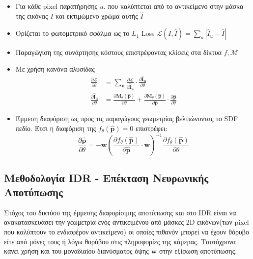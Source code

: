     \begin{itemize}
        \item Για κάθε pixel παρατήρησης \(u\). που καλύπτεται από το αντικείμενο  στην μάσκα της εικόνας \(I\) και εκτιμώμενο χρώμα αυτής \(\hat{I}\)
        \item Ορίζεται το φωτομετρικό σφάλμα ως το \(L_1\) Loss \(\mathcal{L}(I, \hat{I}) = \sum_{u}{|\hat{I}_u - \hat{I}|}\)
        \item Παραγώγιση της συνάρτησης κόστους επιστρέφοντας κλίσεις στα δίκτυα  \(f, \mathcal{M}\)
        \item Με χρήση κανόνα αλυσίδας $$\begin{aligned}
            \frac{\partial \mathcal{L}}{\partial \theta} & =\sum_{\mathbf{u}} \frac{\partial \mathcal{L}}{\partial \hat{\mathbf{I}}_{\mathbf{u}}} \cdot \frac{\partial \hat{\mathbf{I}}_{\mathbf{u}}}{\partial \theta} \\
            \frac{\partial \hat{\mathbf{I}}_{\mathbf{u}}}{\partial \theta} & =\frac{\partial \mathbf{M}_\theta(\hat{\mathbf{p}})}{\partial \theta}+\frac{\partial \mathbf{M}_\theta(\hat{\mathbf{p}})}{\partial \hat{\mathbf{p}}} \cdot \frac{\partial \hat{\mathbf{p}}}{\partial \theta}
            \end{aligned}$$
        \item Έμμεση διαφόριση ως προς τις παραγώγους γεωμετρίας βελτιώνοντας το SDF πεδίο. Έτσι η διαφόριση της \(f_\theta(\hat{\mathbf{p}})=0\) επιστρέφει:
            $$
            \frac{\partial \hat{\mathbf{p}}}{\partial \theta}=-\boldsymbol{w}\left(\frac{\partial f_\theta(\hat{\mathbf{p}})}{\partial \hat{\mathbf{p}}} \cdot \boldsymbol{w}\right)^{-1} \frac{\partial f_\theta(\hat{\mathbf{p}})}{\partial \theta}
            $$
    \end{itemize}
\subsection*{Μεθοδολογία IDR - Επέκταση Νευρωνικής Αποτύπωσης \cite{yariv2020multiview}}
    Στόχος του δικτύου της έμμεσης διαφορίσιμης αποτύπωσης και στο IDR είναι να ανακατασκευάσει την γεωμετρία ενός αντικειμένου από μάσκες 2D εικόνων(των pixel που καλύπτουν το ενδιαφέρον αντικείμενο) οι οποίες πιθανόν μπορεί να έχουν θόρυβο είτε από μόνες τους ή λόγω θορύβου στις πληροφορίες της κάμερας. Ταυτόχρονα κάνει χρήση και του μοναδιαίου διανύσματος όψης \(\boldsymbol{w}\) στην εξίσωση αποτύπωσης.
    
